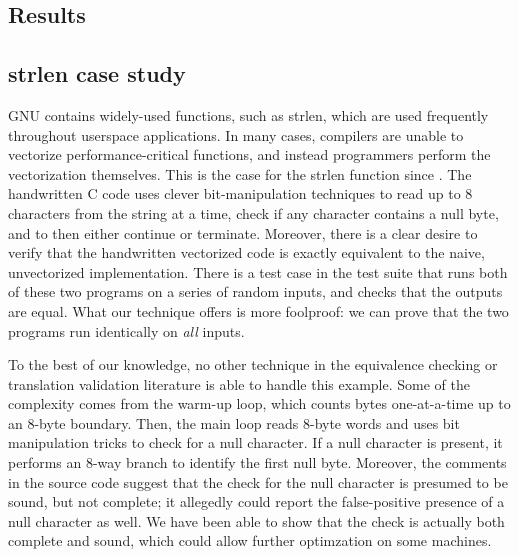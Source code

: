 \subsection{Results}

\subsection{strlen case study}

GNU \libc{} contains widely-used functions, such as strlen, which are
used frequently throughout userspace applications. In many cases,
compilers are unable to vectorize performance-critical functions, and
instead programmers perform the vectorization themselves. This is the
case for the strlen function since \libc{} . The
handwritten C code uses clever bit-manipulation techniques to read
up to 8 characters from the string at a time, check if any character
contains a null byte, and to then either continue or terminate.
Moreover, there is a clear desire to verify that the handwritten
vectorized code is exactly equivalent to the naive, unvectorized
implementation. There is a test case in the \libc{} test suite that
runs both of these two programs on a series of random inputs, and
checks that the outputs are equal. What our technique offers is more
foolproof: we can prove that the two programs run identically on
\emph{all} inputs.

To the best of our knowledge, no other technique in the equivalence
checking or translation validation literature is able to handle this
example. Some of the complexity comes from the warm-up loop, which
counts bytes one-at-a-time up to an 8-byte boundary. Then, the main
loop reads 8-byte words and uses bit manipulation tricks to check
for a null character. If a null character is present, it performs an
8-way branch to identify the first null byte. Moreover, the comments
in the source code suggest that the check for the null character is
presumed to be sound, but not complete; it allegedly could report the
false-positive presence of a null character as well. We have been able
to show that the check is actually both complete and sound, which
could allow further optimzation on some machines.


